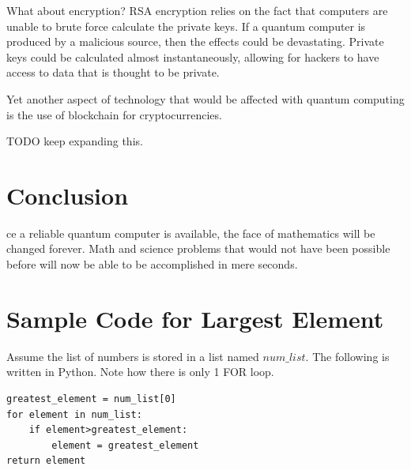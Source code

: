 \documentclass[10pt,journal,compsoc]{IEEEtran}
\begin{document}
What about encryption? RSA encryption relies on the fact that computers are unable to brute force calculate the private keys. If a quantum computer is produced by a malicious source, then the effects could be devastating. Private keys could be calculated almost instantaneously, allowing for hackers to have access to data that is thought to be private.

Yet another aspect of technology that would be affected with quantum computing is the use of blockchain for cryptocurrencies. 

TODO keep expanding this. 


\section{Conclusion}
ce a reliable quantum computer is available, the face of mathematics will be changed forever. Math and science problems that would not have been possible before will now be able to be accomplished in mere seconds. 



%


\appendices
\section{Sample Code for Largest Element}
Assume the list of numbers is stored in a list named $num\_list$. The following is written in Python. Note how there is only 1 FOR loop.
\begin{lstlisting}
greatest_element = num_list[0]
for element in num_list:
	if element>greatest_element:
		element = greatest_element
return element

\end{lstlisting}
\end{document}
